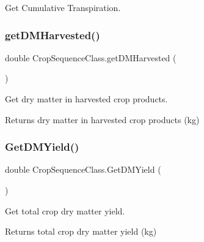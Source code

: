 Get Cumulative Transpiration. 

\mbox{\label{class_crop_sequence_class_a030d38e4cb8fb6c2185899a774e6df57}} 
\subsubsection{\texorpdfstring{getDMHarvested()}{getDMHarvested()}}
{\footnotesize\ttfamily double Crop\+Sequence\+Class.\+get\+D\+M\+Harvested (\begin{DoxyParamCaption}{ }\end{DoxyParamCaption})\hspace{0.3cm}{\ttfamily [inline]}}



Get dry matter in harvested crop products. 

\begin{DoxyReturn}{Returns}
dry matter in harvested crop products (kg) 
\end{DoxyReturn}
\mbox{\label{class_crop_sequence_class_a0e8e7c933602b0e5ba2da6782206ad95}} 
\subsubsection{\texorpdfstring{GetDMYield()}{GetDMYield()}}
{\footnotesize\ttfamily double Crop\+Sequence\+Class.\+Get\+D\+M\+Yield (\begin{DoxyParamCaption}{ }\end{DoxyParamCaption})\hspace{0.3cm}{\ttfamily [inline]}}



Get total crop dry matter yield. 

\begin{DoxyReturn}{Returns}
total crop dry matter yield (kg) 
\end{DoxyReturn}
\mbox{\label{class_crop_sequence_class_a75833d7bee54d75e0c37c0e0294e8545}} 
